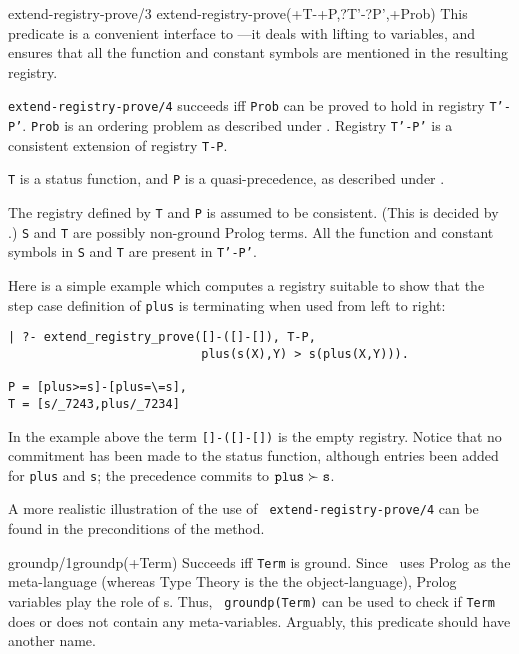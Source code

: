 \begin{predicate}{extend-registry-prove/3}
        {extend-registry-prove(+T-+P,?T'-?P',+Prob)}%
This predicate is a convenient interface to ---it deals
with lifting to variables, and ensures that all the function and
constant symbols are mentioned in the resulting registry.

{\tt extend-registry-prove/4} succeeds iff {\tt Prob} can be proved to
hold in registry {\tt T'-P'}.  {\tt Prob} is an ordering problem as
described under .  Registry {\tt T'-P'} is a
consistent extension of registry {\tt T-P}.

{\tt T} is a status function, and {\tt P} is a quasi-precedence, as
described under .

The registry defined by {\tt T} and {\tt P} is assumed to be
consistent.  (This is decided by .)  {\tt S} and
{\tt T} are possibly non-ground Prolog terms.  All the function and
constant symbols in {\tt S} and {\tt T} are present in {\tt T'-P'}.


\begin{ex}  Here is a simple example which computes a
registry suitable to show that the step case definition of {\tt plus}
is terminating when used from left to right:
\begin{verbatim}
| ?- extend_registry_prove([]-([]-[]), T-P,
                           plus(s(X),Y) > s(plus(X,Y))).

P = [plus>=s]-[plus=\=s],
T = [s/_7243,plus/_7234]
\end{verbatim}
In the example above the term {\tt []-([]-[])} is the empty registry.
Notice that no commitment has been made to the status function,
although entries been added for {\tt plus} and {\tt s}; the precedence
commits to ${\tt plus}\partial {\tt s}$.

A more realistic illustration of the use of {\tt
extend-registry-prove/4} can be found in the preconditions of the
 method.
\end{ex}

\end{predicate}




\begin{predicate}{groundp/1}{groundp(+Term)}%
Succeeds iff {\tt Term} is ground. Since \clam\ uses Prolog as the
meta-language (whereas Type Theory is the the object-language), Prolog
variables play the role of s. Thus, {\tt
groundp(Term)} can be used to check if {\tt Term} does or does not
contain any meta-variables.  Arguably, this predicate should have
another name.
\end{predicate}

